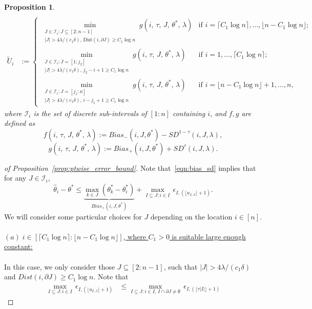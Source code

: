 \documentclass[11pt]{article}
\newcommand{\I}{\mathcal{I}}
\theoremstyle{plain}
\newtheorem{proposition}{Proposition}
\theoremstyle{definition}
\theoremstyle{remark}
\begin{document}
\begin{appendix}
\begin{proposition}
\begin{align*}
\end{align*}
\begin{align*}
\tilde{U}_i &:= 
\begin{cases}
\displaystyle \min_{\substack{J \in \mathcal{I}_i: J \subseteq [2:n-1] \\ |J| > 4\lambda/(c_1\delta),\, \text{Dist}(i, \partial J) \ge C_1 \log n}} g\left(i,\,\tau,\, J,\, \theta^*,\,\lambda\right) & \text{if } i=\lceil C_1 \log n\rceil,\ldots, \lfloor n - C_1 \log n\rfloor; \\[2.5em]
\displaystyle \min_{\substack{J \in \mathcal{I}_i: J = [1:j_2] \\ |J| > 4\lambda/(c_1\delta),\, j_2 - i + 1 \ge C_1 \log n}} g\left(i,\,\tau,\, J,\, \theta^*,\,\lambda\right) & \text{if } i=1,\ldots,\lceil C_1 \log n\rceil; \\[2.5em]
\displaystyle \min_{\substack{J \in \mathcal{I}_i: J = [j_1:n] \\ |J| > 4\lambda/(c_1\delta),\, i - j_1 + 1 \ge C_1 \log n}} g\left(i,\,\tau,\, J,\, \theta^*,\,\lambda\right) & \text{if } i=\lfloor n - C_1 \log n \rfloor +1,\ldots,n,
\end{cases}
\end{align*}
where $\mathcal{I}_i$ is the set of discrete sub-intervals of $[1:n]$ containing $i$, and $f,g$ are defined as
\[f\left(i,\,\tau,\, J,\, \theta^*,\,\lambda\right):=Bias_-(i,J,\theta^*)-SD^{1-\tau}(i,J,\lambda),\]
\[g\left(i,\,\tau,\, J,\, \theta^*,\,\lambda\right):=Bias_+(i,J,\theta^*)+SD^{\tau}(i,J,\lambda).\]
\end{proposition}
\begin{proof}[of Proposition~\ref{prop:ptwise_error_bound}]
Note that~\eqref{eqn:bias_sd} implies that for any $J \in \I_i$,
\[\hat{\theta}_i-\theta^*\leq \underbrace{\max_{k \in J} (\theta^*_k-\theta^*_i)}_{Bias_{+}(i,J,\theta^*)}+\max_{I\subseteq J: i \in I}\,\epsilon_{I,(\lfloor u_{I,J}\rfloor+1)}.\]
We will consider some particular choices for $J$ depending on the location $i \in [n]$.\\
\\
\noindent \underline{$(a)\;i\in [\lceil C_1 \log n\rceil:\lfloor n-C_1\log n\rfloor]$, where $C_1>0$ is suitable large enough constant:}\\
\\
\noindent In this case, we only consider those $J\subseteq [2:n-1]$, such that $|J|>4\lambda/(c_1\delta)$ and $Dist(i,\partial J)\geq C_1 \log n$.
Note that
\begin{align*}
    \max_{I\subseteq J: i \in I}\,\epsilon_{I,(\lfloor u_{I,J}\rfloor+1)}&\leq \max_{I\subseteq J: i \in I,\,I\cap \partial J\neq \emptyset}\,\epsilon_{I,(\lfloor \tau |I|\rfloor+1)} 

\end{align*}
\end{proof}
\end{appendix}
\end{document}
